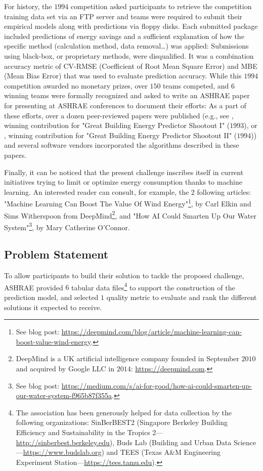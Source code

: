 \documentclass[twocolumn, switch]{article}
\begin{document}
For history, the $1994$ competition asked participants to retrieve the competition training data set via an FTP server and teams were required to submit their empirical models along with predictions via floppy disks. Each submitted package included predictions of energy savings and a sufficient explanation of how the specific method (calculation method, data removal\ldots) was applied: Submissions using black-box, or proprietary methods, were disqualified. It was a combination accuracy metric of CV-RMSE (Coefficient of Root Mean Square Error) and MBE (Mean Bias Error) that was used to evaluate prediction accuracy. While this $1994$ competition awarded no monetary prizes, over $150$ teams competed, and $6$ winning teams were formally recognized and asked to write an ASHRAE paper for presenting at ASHRAE conferences to document their efforts: As a part of these efforts, over a dozen peer-reviewed papers were published (e.g., see \cite{MacKay_1994}, winning contribution for "Great Building Energy Predictor Shootout I" ($1993$), or \cite{Dodier_2004}, winning contribution for "Great Building Energy Predictor Shootout II" ($1994$)) and several software vendors incorporated the algorithms described in these papers.

Finally, it can be noticed that the present challenge inscribes itself in current initiatives trying to limit or optimize energy consumption thanks to machine learning. An interested reader can consult, for example, the $2$ following articles: "Machine Learning Can Boost The Value Of Wind Energy"\footnote{See blog post: \url{https://deepmind.com/blog/article/machine-learning-can-boost-value-wind-energy}.}, by Carl Elkin and Sims Witherspoon from DeepMind\footnote{DeepMind is a UK artificial intelligence company founded in September $2010$ and acquired by Google LLC in $2014$: \url{https://deepmind.com}.}, and "How AI Could Smarten Up Our Water System"\footnote{See blog post: \url{https://medium.com/s/ai-for-good/how-ai-could-smarten-up-our-water-system-f965b87f355a}.}, by Mary Catherine O'Connor.

\subsection{Problem Statement} \label{sub:problem_statement}

To allow participants to build their solution to tackle the proposed challenge, ASHRAE provided $6$ tabular data files\footnote{The association has been generously helped for data collection by the following organizations: SinBerBEST2 (Singapore Berkeley Building Efficiency and Sustainability in the Tropics 2---\url{http://sinberbest.berkeley.edu}), Buds Lab (Building and Urban Data Science---\url{https://www.budslab.org}) and TEES (Texas A\&M Engineering Experiment Station---\url{https://tees.tamu.edu}).} to support the construction of the prediction model, and selected $1$ quality metric to evaluate and rank the different solutions it expected to receive.
\end{document}
